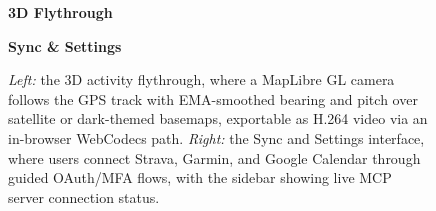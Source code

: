 \begin{figure}[ht]
\centering
\begin{minipage}{0.48\textwidth}
\centering
\textbf{\small 3D Flythrough}\\[2pt]
\end{minipage}
\hfill
\begin{minipage}{0.48\textwidth}
\centering
\textbf{\small Sync \& Settings}\\[2pt]
\end{minipage}
\caption[3D flythrough and sync/settings interfaces]{\textit{Left:} the 3D activity flythrough, where a MapLibre GL camera follows the GPS track with EMA-smoothed bearing and pitch over satellite or dark-themed basemaps, exportable as H.264 video via an in-browser WebCodecs path. \textit{Right:} the Sync and Settings interface, where users connect Strava, Garmin, and Google Calendar through guided OAuth/MFA flows, with the sidebar showing live MCP server connection status.}\label{fig:screenshot_advanced_features}
\end{figure}
